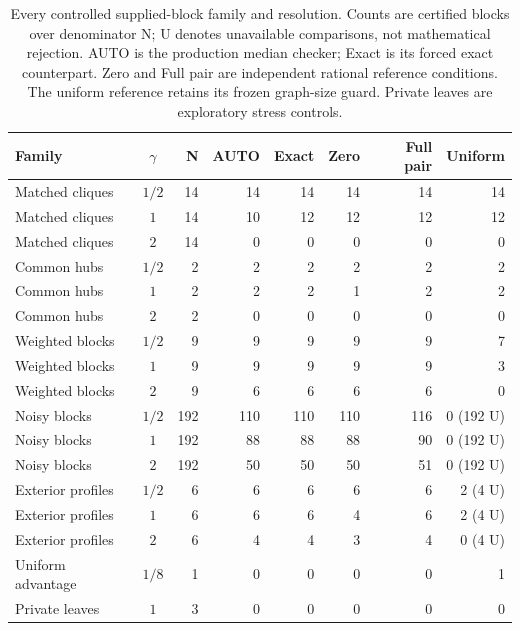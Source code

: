 \documentclass[sigconf,anonymous,review]{acmart}
\newcommand{\1}{\mathbf{1}}
\begin{document}
\begin{table}[t]
\caption{Every controlled supplied-block family and resolution. Counts are certified blocks over denominator N; U denotes unavailable comparisons, not mathematical rejection. AUTO is the production median checker; Exact is its forced exact counterpart. Zero and Full pair are independent rational reference conditions. The uniform reference retains its frozen graph-size guard. Private leaves are exploratory stress controls.}\label{tab:mechanism-details}
\centering\small
\begin{tabular}{lcrrrrrr}\toprule
Family & $\gamma$ & N & AUTO & Exact & Zero & Full pair & Uniform\\\midrule
Matched cliques & $1/2$ & 14 & 14 & 14 & 14 & 14 & 14\\
Matched cliques & $1$ & 14 & 10 & 12 & 12 & 12 & 12\\
Matched cliques & $2$ & 14 & 0 & 0 & 0 & 0 & 0\\
Common hubs & $1/2$ & 2 & 2 & 2 & 2 & 2 & 2\\
Common hubs & $1$ & 2 & 2 & 2 & 1 & 2 & 2\\
Common hubs & $2$ & 2 & 0 & 0 & 0 & 0 & 0\\
Weighted blocks & $1/2$ & 9 & 9 & 9 & 9 & 9 & 7\\
Weighted blocks & $1$ & 9 & 9 & 9 & 9 & 9 & 3\\
Weighted blocks & $2$ & 9 & 6 & 6 & 6 & 6 & 0\\
Noisy blocks & $1/2$ & 192 & 110 & 110 & 110 & 116 & 0 (192 U)\\
Noisy blocks & $1$ & 192 & 88 & 88 & 88 & 90 & 0 (192 U)\\
Noisy blocks & $2$ & 192 & 50 & 50 & 50 & 51 & 0 (192 U)\\
Exterior profiles & $1/2$ & 6 & 6 & 6 & 6 & 6 & 2 (4 U)\\
Exterior profiles & $1$ & 6 & 6 & 6 & 4 & 6 & 2 (4 U)\\
Exterior profiles & $2$ & 6 & 4 & 4 & 3 & 4 & 0 (4 U)\\
Uniform advantage & $1/8$ & 1 & 0 & 0 & 0 & 0 & 1\\
Private leaves & $1$ & 3 & 0 & 0 & 0 & 0 & 0\\
\bottomrule\end{tabular}
\end{table}
\end{document}
